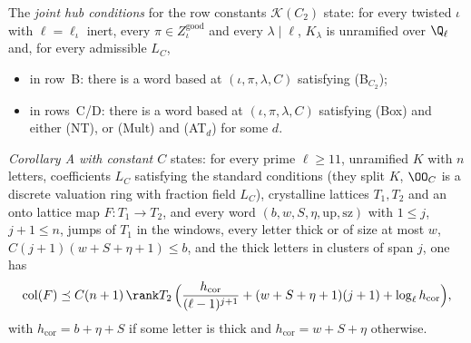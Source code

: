 \begin{definition}\label{pf:linkN-adm:def-joint}
The \emph{joint hub conditions} for the row constants $\mathcal K(C_2)$ state: for every
twisted $\iota$ with $\ell=\ell_\iota$ inert, every $\pi\in Z^{\mathrm{good}}_\iota$ and every $\lambda\mid\ell$, $K_\lambda$
is unramified over $\Q_\ell$ and, for every admissible $L_C$,
\begin{itemize}
\item in row~B: there is a word based at $(\iota,\pi,\lambda,C)$ satisfying (B$_{C_2}$);
\item in rows~C/D: there is a word based at $(\iota,\pi,\lambda,C)$ satisfying (Box) and either (NT), or (Mult) and
  (AT$_d$) for some $d$.
\end{itemize}
\emph{Corollary A with constant $C$} states: for every prime $\ell\ge11$, unramified $K$ with $n$ letters, coefficients
$L_C$ satisfying the standard conditions (they split $K$, $\OO_C$ is a discrete valuation ring with fraction field $L_C$),
crystalline lattices $T_1,T_2$ and an onto lattice map $F\colon T_1\to T_2$, and every word $(b,w,S,\eta,\mathrm{up},
\mathrm{sz})$ with $1\le j$, $j+1\le n$, jumps of $T_1$ in the windows, every letter thick or of size at most $w$,
$C(j+1)(w+S+\eta+1)\le b$, and the thick letters in clusters of span $j$, one has
\begin{equation}\label{pf:linkN-adm:eq-corA}
\linkNadmcol(F)\preceq C(n+1)\,\rank T_2\,\Bigl(\frac{h_{\mathrm{cor}}}{(\ell-1)^{j+1}}+(w+S+\eta+1)(j+1)
+\log_\ell h_{\mathrm{cor}}\Bigr),
\end{equation}
with $h_{\mathrm{cor}}=b+\eta+S$ if some letter is thick and $h_{\mathrm{cor}}=w+S+\eta$ otherwise.
\end{definition}

